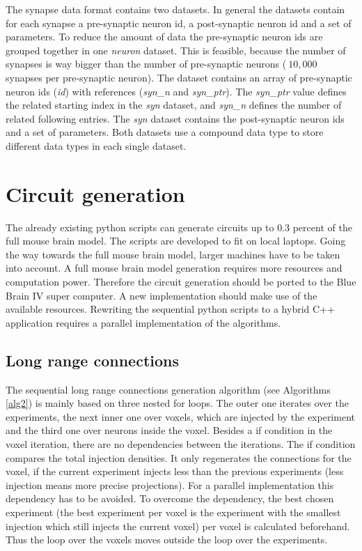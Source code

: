 The synapse data format contains two datasets. In general the datasets contain for each synapse
a pre-synaptic neuron id, a post-synaptic neuron id and a set of parameters.
To reduce the amount of data the pre-synaptic neuron ids are grouped together in one \emph{neuron} dataset.
This is feasible, because
the number of synapses is way bigger than the number of pre-synaptic neurons ($~10,000$ synapses per pre-synaptic neuron).
The dataset contains an array of  pre-synaptic neuron ids (\emph{id}) with references (\emph{syn\_n} and \emph{syn\_ptr}).
The \emph{syn\_ptr} value defines the related starting index in the \emph{syn} dataset,
and \emph{syn\_n} defines the number of related following entries.
The \emph{syn} dataset contains the post-synaptic neuron ids and a set of parameters.
Both datasets use a compound data type to store different data types in each single dataset.


\section{Circuit generation}
The already existing python scripts can generate circuits up to $0.3$ percent of the full mouse brain model.
The scripts are developed to fit on local laptops.
Going the way towards the full mouse brain model, larger machines have to be taken into account.
A full mouse brain model generation requires more resources and computation power.
Therefore the circuit generation should be ported to the Blue Brain IV super computer.
A new implementation should make use of the available resources.
Rewriting the sequential python scripts to a hybrid C++ application requires a parallel implementation of the algorithms.




\subsection{Long range connections}

The sequential long range connections generation algorithm (see Algorithms \ref{alg2}) is mainly based on three nested for loops.
The outer one iterates over the experiments, the next inner one over voxels, which are injected by the experiment and the third
one over neurons inside the voxel.
Besides a if condition in the voxel iteration, there are no dependencies between the iterations.
The if condition compares the total injection densities.
It only regenerates the connections for the voxel, if the current
experiment injects less than the previous experiments (less injection means more precise projections).
For a parallel implementation this dependency has to be avoided.
To overcome the dependency, the best chosen experiment (the best experiment per voxel is the experiment with the smallest injection which still injects the current voxel) per voxel is calculated beforehand.
Thus the loop over the voxels moves outside the loop over the experiments.


